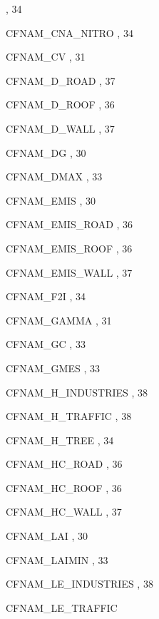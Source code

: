 \begin{theindex}
    \subitem {},  34
  \item CFNAM\_CNA\_NITRO
    \subitem {},  34
  \item CFNAM\_CV
    \subitem {},  31
  \item CFNAM\_D\_ROAD
    \subitem {},  37
  \item CFNAM\_D\_ROOF
    \subitem {},  36
  \item CFNAM\_D\_WALL
    \subitem {},  37
  \item CFNAM\_DG
    \subitem {},  30
  \item CFNAM\_DMAX
    \subitem {},  33
  \item CFNAM\_EMIS
    \subitem {},  30
  \item CFNAM\_EMIS\_ROAD
    \subitem {},  36
  \item CFNAM\_EMIS\_ROOF
    \subitem {},  36
  \item CFNAM\_EMIS\_WALL
    \subitem {},  37
  \item CFNAM\_F2I
    \subitem {},  34
  \item CFNAM\_GAMMA
    \subitem {},  31
  \item CFNAM\_GC
    \subitem {},  33
  \item CFNAM\_GMES
    \subitem {},  33
  \item CFNAM\_H\_INDUSTRIES
    \subitem {},  38
  \item CFNAM\_H\_TRAFFIC
    \subitem {},  38
  \item CFNAM\_H\_TREE
    \subitem {},  34
  \item CFNAM\_HC\_ROAD
    \subitem {},  36
  \item CFNAM\_HC\_ROOF
    \subitem {},  36
  \item CFNAM\_HC\_WALL
    \subitem {},  37
  \item CFNAM\_LAI
    \subitem {},  30
  \item CFNAM\_LAIMIN
    \subitem {},  33
  \item CFNAM\_LE\_INDUSTRIES
    \subitem {},  38
  \item CFNAM\_LE\_TRAFFIC

\end{theindex}
